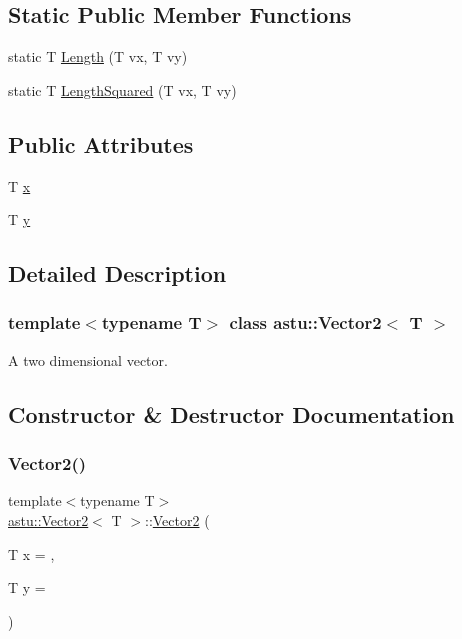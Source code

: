 \subsection*{Static Public Member Functions}
\begin{DoxyCompactItemize}
\item 
static T \hyperlink{classastu_1_1Vector2_a7fdf839b6c3444121dc6fb2eb88c200e}{Length} (T vx, T vy)
\item 
static T \hyperlink{classastu_1_1Vector2_afbc3ba40ff99e66abbe5db6b5adb6b97}{Length\+Squared} (T vx, T vy)
\end{DoxyCompactItemize}
\subsection*{Public Attributes}
\begin{DoxyCompactItemize}
\item 
T \hyperlink{classastu_1_1Vector2_aa60c30b27742255fbe7053b07a7e76ba}{x}
\item 
T \hyperlink{classastu_1_1Vector2_a6718f5a7005c38830dbd31283a87f5c9}{y}
\end{DoxyCompactItemize}


\subsection{Detailed Description}
\subsubsection*{template$<$typename T$>$\newline
class astu\+::\+Vector2$<$ T $>$}

A two dimensional vector. 

\subsection{Constructor \& Destructor Documentation}
\mbox{\label{classastu_1_1Vector2_a021ec0e80fa7ca80921a17172e30fe29}} 
\subsubsection{\texorpdfstring{Vector2()}{Vector2()}}
{\footnotesize\ttfamily template$<$typename T$>$ \\
\hyperlink{classastu_1_1Vector2}{astu\+::\+Vector2}$<$ T $>$\+::\hyperlink{classastu_1_1Vector2}{Vector2} (\begin{DoxyParamCaption}\item[{T}]{x = {},  }\item[{T}]{y = {} }\end{DoxyParamCaption})\hspace{0.3cm}{\ttfamily [inline]}}

